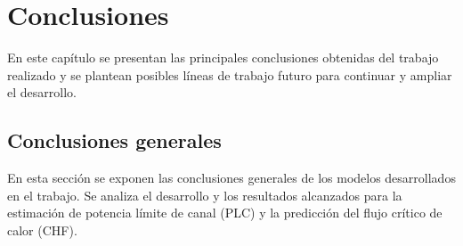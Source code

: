 
\chapter{Conclusiones} %

\label{Chapter5} %
En este capítulo se presentan las principales conclusiones obtenidas del trabajo realizado y se plantean posibles líneas de trabajo futuro para continuar y ampliar el desarrollo.

\section{Conclusiones generales}





En esta sección se exponen las conclusiones generales de los modelos desarrollados en el trabajo. Se analiza el desarrollo y los resultados alcanzados para la estimación de potencia límite de canal (PLC) y la predicción del flujo crítico de calor (CHF).

